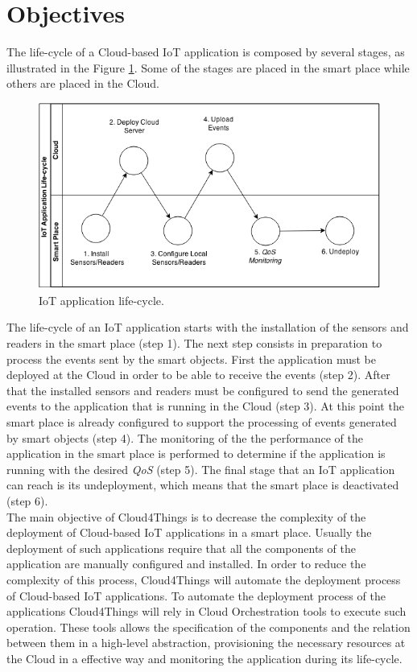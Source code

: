 \section{Objectives}
\label{sec:objectives}
The life-cycle of a Cloud-based IoT application is composed by several stages,
as illustrated in the Figure \ref{fig:life-cycle}. Some of the stages are placed in
the smart place while others are placed in the Cloud.
\begin{figure}[h!]
  \centering
  \includegraphics[width=\textwidth]{./images/life-cycle}
  \caption{IoT application life-cycle.}
  \label{fig:life-cycle}
\end{figure}

The life-cycle of an IoT application starts with the installation of the sensors and
readers in the smart place (step 1). The next step consists in preparation to
process the events sent by the smart objects. First the application must be deployed at
the Cloud in order to be able to receive the events (step 2). After that the installed
sensors and readers must be configured to send the generated events to the application that is
running in the Cloud (step 3). At this point the smart place is already configured to
support the processing of events generated by smart objects (step 4). The monitoring of the
the performance of the application in the smart place is performed to determine if the
application is running  with the desired \textit{QoS} (step 5). The final stage that an IoT
application can reach is its undeployment, which means that the smart place is deactivated (step 6).\\

The main objective of Cloud4Things is to decrease the complexity of the deployment of Cloud-based
IoT applications in a smart place. Usually the deployment of such applications require that
all the components of the application are manually configured and installed. In order
to reduce the complexity of this process, Cloud4Things will automate the deployment process
of Cloud-based IoT applications. To automate the deployment process of the applications
Cloud4Things will rely in Cloud Orchestration tools to execute such operation. These
tools allows the specification of the components and the relation between them in a
high-level abstraction, provisioning the necessary resources at the Cloud in a effective
way and monitoring the application during its life-cycle.\\

